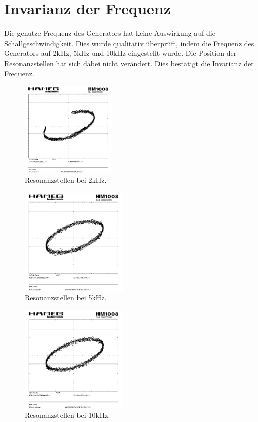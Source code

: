 \section{Invarianz der Frequenz}
Die genutze Frequenz des Generators hat keine Auswirkung auf die Schallgeschwindigkeit. Dies wurde qualitativ überprüft, indem die Frequenz des Generators auf 2kHz, 5kHz und 10kHz eingestellt wurde. Die Position der Resonanzstellen hat sich dabei nicht verändert. Dies bestätigt die Invarianz der Frequenz.
\begin{figure}[!ht]
    \centering
    \includegraphics[width=0.4\textwidth]{img/26/Hallo_image1-72_Vergleich.pdf}
    \caption{Resonanzstellen bei 2kHz.}
    \label{fig:invarianz2}
\end{figure}

\onecolumn
\begin{figure}[!ht]
    \centering
    \includegraphics[width=0.45\textwidth]{img/26/Hallo_image1-6_Vergleich.pdf}
    \caption{Resonanzstellen bei 5kHz.}
    \label{fig:invarianz}
\end{figure}

\begin{figure}[!ht]
    \centering
    \includegraphics[width=0.45\textwidth]{img/26/Hallo_image1-7_Vergleich.pdf}
    \caption{Resonanzstellen bei 10kHz.}
    \label{fig:invarianz3}
\end{figure}
\twocolumn